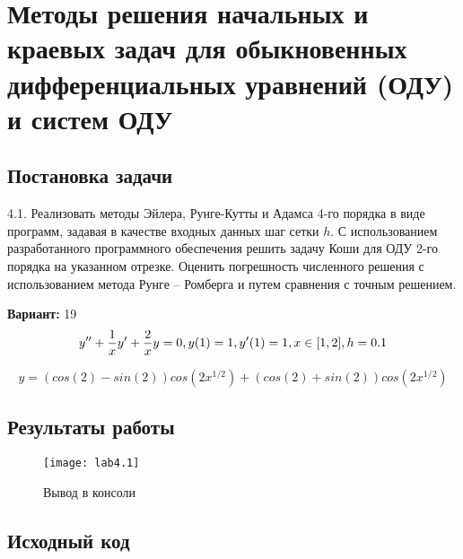 \section{Методы решения начальных и краевых задач для обыкновенных дифференциальных уравнений (ОДУ) и систем ОДУ}

\subsection{Постановка задачи}
4.1. Реализовать методы Эйлера, Рунге-Кутты и Адамса 4-го порядка в виде программ, задавая в качестве входных данных шаг сетки $h$. С использованием разработанного программного обеспечения решить задачу Коши для ОДУ 2-го порядка на указанном отрезке. Оценить погрешность численного решения с использованием метода Рунге – Ромберга и путем сравнения с точным решением. 

{\bfseries Вариант:} 19
    \begin{equation}
        y'' + \frac{1}{x} y' + \frac{2}{x} y = 0, \\
        y(1) = 1, \\
        y'(1) = 1, \\
        x \in [1,2], h = 0.1
    \end{equation}
    
    \begin{equation}
		y = (cos(2)-sin(2))cos(2x^{1/2})+(cos(2)+sin(2))cos(2x^{1/2})
    \end{equation}
\pagebreak

\subsection{Результаты работы}
\begin{figure}[h!]
\centering
\texttt{[image: lab4.1]}
\caption{Вывод в консоли}
\end{figure}


\subsection{Исходный код}

\pagebreak

